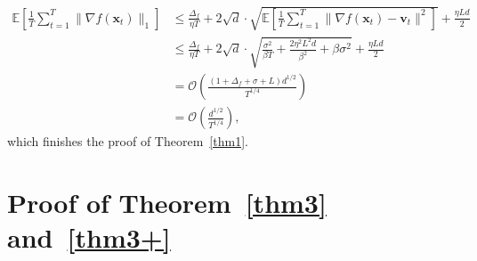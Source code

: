 \documentclass{article}
\newcommand{\E}{\mathbb{E}}
\def \E {\mathbb{E}}
\def \v {\mathbf{v}}
\def \x {\mathbf{x}}
\def \E {\mathbb{E}}
\def \x {\mathbf{x}}
\def \v {\mathbf{v}}
\begin{document}
\begin{equation*}
    \begin{split}
        \E\left[\frac{1}{T}\sum_{t=1}^{T} \|\nabla f(\x_t)\|_1\right] 
& \leq \frac{\Delta_f}{\eta T} +2\sqrt{d} \cdot \sqrt{\E\left[\frac{1}{T}\sum_{t=1}^{T} \|\nabla f(\x_t) - \v_t\|^2\right]}+ \frac{\eta L d}{2} \\
& \leq \frac{\Delta_f}{\eta T} +2\sqrt{d} \cdot \sqrt{\frac{\sigma^2}{\beta T}  + \frac{2\eta^2 L^2  d}{\beta^2}+ \beta\sigma^2}+ \frac{\eta L d}{2} \\
&= \mathcal{O}\left( \frac{ \left(1+\Delta_f+\sigma+L \right) d^{1/2}}{T^{1/4}}\right) \\
&= \mathcal{O}\left( \frac{d^{1/2}}{T^{1/4}}\right),
    \end{split}
\end{equation*}
which finishes the proof of Theorem~\ref{thm1}.


\section{Proof of Theorem~\ref{thm3} and~\ref{thm3+}}\label{APP:D}
\end{document}
